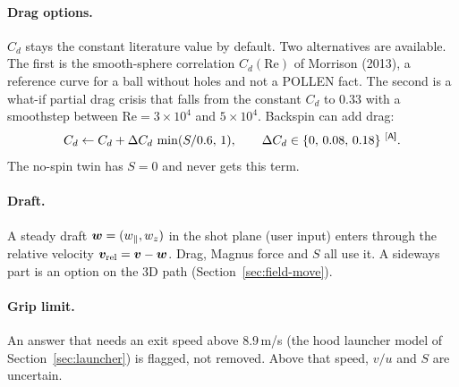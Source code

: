 \paragraph{Drag options.} $C_d$ stays the constant literature value by default. Two alternatives are
available. The first is the smooth-sphere correlation $C_d(\mathrm{Re})$ of Morrison (2013), a reference
curve for a ball without holes and not a POLLEN fact. The second is a what-if partial drag crisis that
falls from the constant $C_d$ to $0.33$\assumed{} with a smoothstep between $\mathrm{Re}=3\times10^4$ and
$5\times10^4$\assumed. Backspin can add drag:
\begin{equation}
  C_d\leftarrow C_d+\Delta C_d\,\min(S/0.6,\,1),\qquad \Delta C_d\in\{0,\,0.08,\,0.18\}\assumed .
  \label{eq:field-spindrag}
\end{equation}
The no-spin twin has $S=0$ and never gets this term.

\paragraph{Draft.} A steady draft $\bm{w}=(w_\parallel,w_z)$ in the shot plane (user input) enters
through the relative velocity $\bm{v}_{\text{rel}}=\bm{v}-\bm{w}$. Drag, Magnus force and $S$ all
use it. A sideways part is an option on the 3D path (Section~\ref{sec:field-move}).

\paragraph{Grip limit.} An answer that needs an exit speed above $8.9$\,\unit{m/s}\predicted{}
(the hood launcher model of Section~\ref{sec:launcher}) is flagged, not removed. Above that speed,
$v/u$ and $S$ are uncertain.


